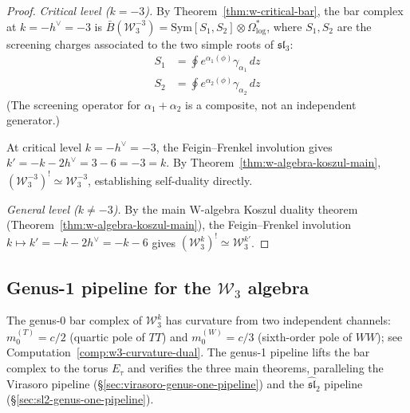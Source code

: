 \begin{proof}
\emph{Critical level ($k = -3$).}
By Theorem~\ref{thm:w-critical-bar}, the bar complex at $k = -h^\vee = -3$
is $\bar{B}(\mathcal{W}_3^{-3}) = \mathrm{Sym}[S_1, S_2] \otimes
\Omega^*_{\log}$, where $S_1, S_2$ are the screening charges
associated to the two simple roots of $\mathfrak{sl}_3$:
\begin{align}
S_1 &= \oint e^{\alpha_1(\phi)} \gamma_{\alpha_1}\, dz \\
S_2 &= \oint e^{\alpha_2(\phi)} \gamma_{\alpha_2}\, dz
\end{align}
(The screening operator for $\alpha_1 + \alpha_2$ is a composite,
not an independent generator.)

At critical level $k = -h^\vee = -3$, the Feigin--Frenkel involution gives $k' = -k - 2h^\vee = 3 - 6 = -3 = k$.  By Theorem~\ref{thm:w-algebra-koszul-main}, $(\mathcal{W}_3^{-3})^! \simeq \mathcal{W}_3^{-3}$, establishing self-duality directly.

\emph{General level ($k \neq -3$).}
By the main W-algebra Koszul duality theorem
(Theorem~\ref{thm:w-algebra-koszul-main}), the Feigin--Frenkel
involution $k \mapsto k' = -k - 2h^\vee = -k - 6$ gives
$(\mathcal{W}_3^k)^! \simeq \mathcal{W}_3^{k'}$.
\end{proof}

\subsection{\texorpdfstring{Genus-1 pipeline for the $\mathcal{W}_3$ algebra}{Genus-1 pipeline for the W3 algebra}}
\label{sec:w3-genus-one-pipeline}

The genus-0 bar complex of $\mathcal{W}_3^k$ has curvature from two
independent channels: $m_0^{(T)} = c/2$ (quartic pole of $TT$) and
$m_0^{(W)} = c/3$ (sixth-order pole of $WW$); see
Computation~\ref{comp:w3-curvature-dual}.  The genus-1
pipeline lifts the bar complex to the torus $E_\tau$ and
verifies the three main theorems, paralleling the Virasoro pipeline
(\S\ref{sec:virasoro-genus-one-pipeline}) and the
$\widehat{\mathfrak{sl}}_2$ pipeline (\S\ref{sec:sl2-genus-one-pipeline}).

